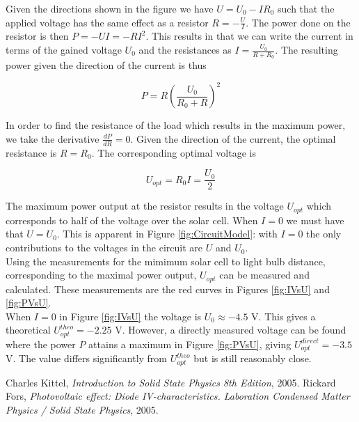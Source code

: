 \documentclass[a4paper,twoside=false,abstract=false,numbers=noenddot,
titlepage=false,headings=small,parskip=half,version=last]{scrartcl}
\begin{document}
Given the directions shown in the figure we have $U=U_0-IR_0$ such that the
applied voltage has the same effect as a resistor $R=-\frac{U}{I}$.
The power done on the resistor is then $P=-U I=-R I^{2}$.
This results in that we can write the current in terms of the gained voltage $U_0$ and the resistances as $I=\frac{U_0}{R + R_0}$.
The resulting power given the direction of the current is thus

\begin{equation}
    P = R (\frac{ U_0}{ R_0+R})^{2}
\end{equation}

In order to find the resistance of the load which results in the maximum power, we take the derivative $\frac{dP}{dR} = 0$.
Given the direction of the current, the optimal resistance is $R = R_0$. The corresponding optimal voltage is

\begin{equation}
    U_{opt}=R_0 I=\frac{U_0}{2}
\end{equation}

The maximum power output at the resistor results in the voltage $ U_{opt}$
which corresponds to half of the voltage over the solar cell.
When $I=0$ we must have that $U = U_0$.
This is apparent in Figure \ref{fig:CircuitModel}: with $I=0$ the only contributions to the voltages in the circuit are $U$ and $U_0$.\\
Using the measurements for the mimimum solar cell to light bulb distance, corresponding to the maximal power output, $U_{opt}$ can be measured and calculated. These measurements are the red curves in Figures \ref{fig:IVsU} and \ref{fig:PVsU}.\\
When $I=0$ in Figure \ref{fig:IVsU} the voltage is $U_0\approx -4.5$ V. This gives a theoretical $U_{opt}^{theo}=-2.25$ V. However, a directly measured voltage can be found where the power $P$ attains a maximum in Figure \ref{fig:PVsU}, giving $U_{opt}^{direct}=-3.5$ V. The value differs significantly from $U_{opt}^{theo}$ but is still reasonably close.

\begin{thebibliography}{1}
        Charles Kittel,
        {\em Introduction to Solid State Physics 8th Edition},
        2005.
		Rickard Fors,
		{\em Photovoltaic effect: Diode IV-characteristics. Laboration Condensed Matter Physics / Solid State Physics},
		2005.
\end{thebibliography}
\end{document}
